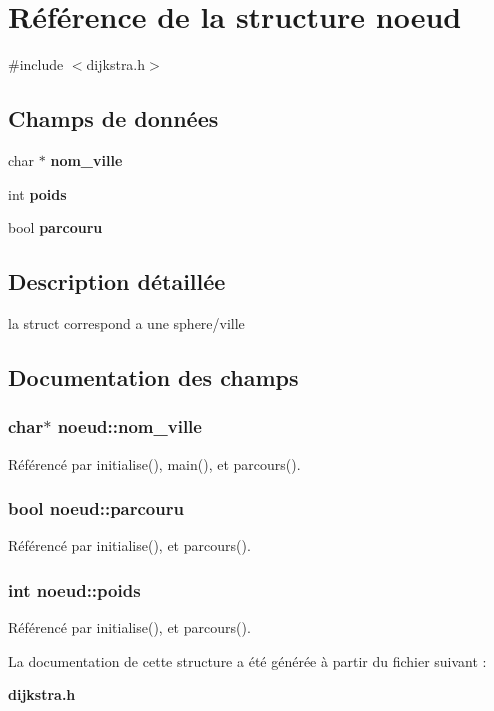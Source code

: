\section{Référence de la structure noeud}
\label{structnoeud}


{\ttfamily \#include $<$dijkstra.\+h$>$}

\subsection*{Champs de données}
\begin{DoxyCompactItemize}
\item 
char $\ast$ {\bf nom\+\_\+ville}
\item 
int {\bf poids}
\item 
bool {\bf parcouru}
\end{DoxyCompactItemize}


\subsection{Description détaillée}
la struct correspond a une sphere/ville 

\subsection{Documentation des champs}
\subsubsection[{nom\+\_\+ville}]{\setlength{\rightskip}{0pt plus 5cm}char$\ast$ noeud\+::nom\+\_\+ville}\label{structnoeud_a4aba29dc74d51496cc3205efb655e9d1}


Référencé par initialise(), main(), et parcours().

\subsubsection[{parcouru}]{\setlength{\rightskip}{0pt plus 5cm}bool noeud\+::parcouru}\label{structnoeud_a63e747e6502ddfd2820748efda605c29}


Référencé par initialise(), et parcours().

\subsubsection[{poids}]{\setlength{\rightskip}{0pt plus 5cm}int noeud\+::poids}\label{structnoeud_a3ae968880325c2ec0c211b8aeec6b78c}


Référencé par initialise(), et parcours().



La documentation de cette structure a été générée à partir du fichier suivant \+:\begin{DoxyCompactItemize}
\item 
{\bf dijkstra.\+h}\end{DoxyCompactItemize}
